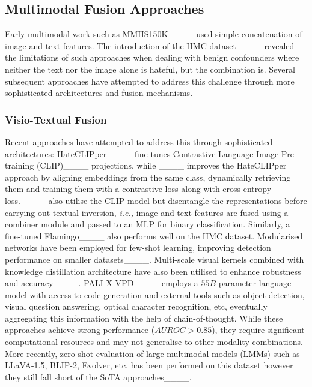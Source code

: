 \subsection{Multimodal Fusion Approaches}
Early multimodal work such as MMHS150K____ used simple concatenation of image and text features. The introduction of the HMC dataset____ revealed the limitations of such approaches when dealing with benign confounders where neither the text nor the image alone is hateful, but the combination is. Several subsequent approaches have attempted to address this challenge through more sophisticated architectures and fusion mechanisms.

\subsubsection{Visio-Textual Fusion}
Recent approaches have attempted to address this through sophisticated architectures: HateCLIPper____ fine-tunes Contrastive Language Image Pre-training (CLIP)____ projections, while ____ improves the HateCLIPper approach by aligning embeddings from the same class, dynamically retrieving them and training them with a contrastive loss along with cross-entropy loss.____ also utilise the CLIP model but disentangle the representations before carrying out textual inversion, \textit{i.e.,} image and text features are fused using a combiner module and passed to an MLP for binary classification. Similarly, a fine-tuned Flamingo____ also performs well on the HMC dataset. Modularised networks have been employed for few-shot learning, improving detection performance on smaller datasets____. Multi-scale visual kernels combined with knowledge distillation architecture have also been utilised to enhance robustness and accuracy____. PALI-X-VPD____ employs a $55B$ parameter language model with access to code generation and external tools such as object detection, visual question answering, optical character recognition, etc, eventually aggregating this information with the help of chain-of-thought. While these approaches achieve strong performance ($AUROC > 0.85$), they require significant computational resources and may not generalise to other modality combinations. More recently, zero-shot evaluation of large multimodal models (LMMs) such as LLaVA-1.5, BLIP-2, Evolver, etc. has been performed on this dataset however they still fall short of the SoTA approaches____.

